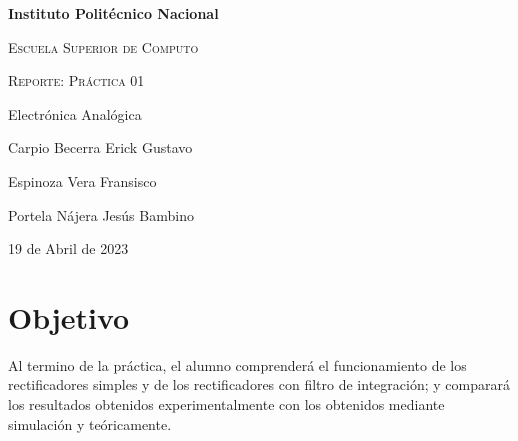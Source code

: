 \documentclass[12pt]{article}
\begin{document}
    \begin{titlepage}  
        \centering
        {\bfseries\LARGE Instituto Politécnico Nacional\par}
        \vspace{0.5cm}
        {\scshape\Large Escuela Superior de Computo \par}
        \vspace{2cm}
        {\scshape\Huge Reporte: Práctica 01 \par}
        \vspace{3cm}
        {\LARGE Electrónica Analógica \par}
        \vfill
        {\Large Carpio Becerra Erick Gustavo \par}
        {\Large Espinoza Vera Fransisco \par}
        {\Large Portela Nájera Jesús Bambino \par}
        \vfill
        {\Large 19 de Abril de 2023 \par}
    \end{titlepage}
    \section*{Objetivo}
    \label{sec:objetivo}
        Al termino de la práctica, el alumno comprenderá el funcionamiento de los rectificadores simples y de 
        los rectificadores con filtro de integración; y comparará los resultados obtenidos experimentalmente con los 
        obtenidos mediante simulación y teóricamente.
\end{document}
